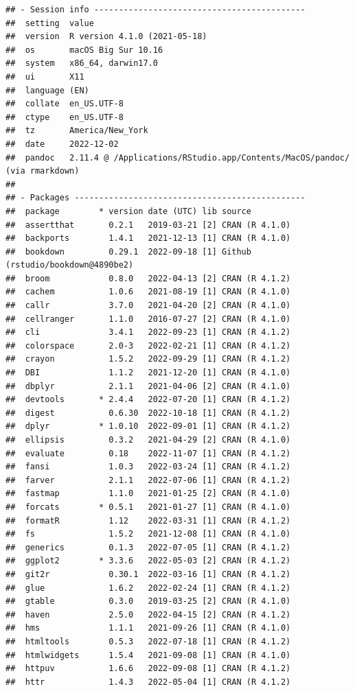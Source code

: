 \documentclass[print]{nuthesis}
\begin{document}
\begin{verbatim}
## - Session info -------------------------------------------
##  setting  value
##  version  R version 4.1.0 (2021-05-18)
##  os       macOS Big Sur 10.16
##  system   x86_64, darwin17.0
##  ui       X11
##  language (EN)
##  collate  en_US.UTF-8
##  ctype    en_US.UTF-8
##  tz       America/New_York
##  date     2022-12-02
##  pandoc   2.11.4 @ /Applications/RStudio.app/Contents/MacOS/pandoc/ (via rmarkdown)
## 
## - Packages -----------------------------------------------
##  package        * version date (UTC) lib source
##  assertthat       0.2.1   2019-03-21 [2] CRAN (R 4.1.0)
##  backports        1.4.1   2021-12-13 [1] CRAN (R 4.1.0)
##  bookdown         0.29.1  2022-09-18 [1] Github (rstudio/bookdown@4890be2)
##  broom            0.8.0   2022-04-13 [2] CRAN (R 4.1.2)
##  cachem           1.0.6   2021-08-19 [1] CRAN (R 4.1.0)
##  callr            3.7.0   2021-04-20 [2] CRAN (R 4.1.0)
##  cellranger       1.1.0   2016-07-27 [2] CRAN (R 4.1.0)
##  cli              3.4.1   2022-09-23 [1] CRAN (R 4.1.2)
##  colorspace       2.0-3   2022-02-21 [1] CRAN (R 4.1.2)
##  crayon           1.5.2   2022-09-29 [1] CRAN (R 4.1.2)
##  DBI              1.1.2   2021-12-20 [1] CRAN (R 4.1.0)
##  dbplyr           2.1.1   2021-04-06 [2] CRAN (R 4.1.0)
##  devtools       * 2.4.4   2022-07-20 [1] CRAN (R 4.1.2)
##  digest           0.6.30  2022-10-18 [1] CRAN (R 4.1.2)
##  dplyr          * 1.0.10  2022-09-01 [1] CRAN (R 4.1.2)
##  ellipsis         0.3.2   2021-04-29 [2] CRAN (R 4.1.0)
##  evaluate         0.18    2022-11-07 [1] CRAN (R 4.1.2)
##  fansi            1.0.3   2022-03-24 [1] CRAN (R 4.1.2)
##  farver           2.1.1   2022-07-06 [1] CRAN (R 4.1.2)
##  fastmap          1.1.0   2021-01-25 [2] CRAN (R 4.1.0)
##  forcats        * 0.5.1   2021-01-27 [1] CRAN (R 4.1.0)
##  formatR          1.12    2022-03-31 [1] CRAN (R 4.1.2)
##  fs               1.5.2   2021-12-08 [1] CRAN (R 4.1.0)
##  generics         0.1.3   2022-07-05 [1] CRAN (R 4.1.2)
##  ggplot2        * 3.3.6   2022-05-03 [2] CRAN (R 4.1.2)
##  git2r            0.30.1  2022-03-16 [1] CRAN (R 4.1.2)
##  glue             1.6.2   2022-02-24 [1] CRAN (R 4.1.2)
##  gtable           0.3.0   2019-03-25 [2] CRAN (R 4.1.0)
##  haven            2.5.0   2022-04-15 [2] CRAN (R 4.1.2)
##  hms              1.1.1   2021-09-26 [1] CRAN (R 4.1.0)
##  htmltools        0.5.3   2022-07-18 [1] CRAN (R 4.1.2)
##  htmlwidgets      1.5.4   2021-09-08 [1] CRAN (R 4.1.0)
##  httpuv           1.6.6   2022-09-08 [1] CRAN (R 4.1.2)
##  httr             1.4.3   2022-05-04 [1] CRAN (R 4.1.2)

\end{verbatim}
\end{document}

